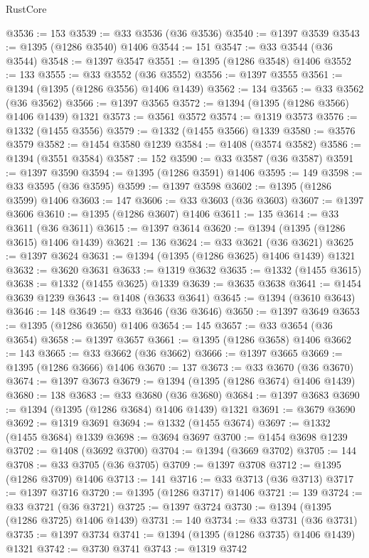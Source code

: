 \begin{lexlean}{RustCore}
\begin{coremodule}
@3536 := 153
@3539 := @33 @3536 (@36 @3536)
@3540 := @1397 @3539
@3543 := @1395 (@1286 @3540) @1406
@3544 := 151
@3547 := @33 @3544 (@36 @3544)
@3548 := @1397 @3547
@3551 := @1395 (@1286 @3548) @1406
@3552 := 133
@3555 := @33 @3552 (@36 @3552)
@3556 := @1397 @3555
@3561 := @1394 (@1395 (@1286 @3556) @1406 @1439)
@3562 := 134
@3565 := @33 @3562 (@36 @3562)
@3566 := @1397 @3565
@3572 := @1394 (@1395 (@1286 @3566) @1406 @1439) @1321
@3573 := @3561 @3572
@3574 := @1319 @3573
@3576 := @1332 (@1455 @3556)
@3579 := @1332 (@1455 @3566) @1339
@3580 := @3576 @3579
@3582 := @1454 @3580 @1239
@3584 := @1408 (@3574 @3582)
@3586 := @1394 (@3551 @3584)
@3587 := 152
@3590 := @33 @3587 (@36 @3587)
@3591 := @1397 @3590
@3594 := @1395 (@1286 @3591) @1406
@3595 := 149
@3598 := @33 @3595 (@36 @3595)
@3599 := @1397 @3598
@3602 := @1395 (@1286 @3599) @1406
@3603 := 147
@3606 := @33 @3603 (@36 @3603)
@3607 := @1397 @3606
@3610 := @1395 (@1286 @3607) @1406
@3611 := 135
@3614 := @33 @3611 (@36 @3611)
@3615 := @1397 @3614
@3620 := @1394 (@1395 (@1286 @3615) @1406 @1439)
@3621 := 136
@3624 := @33 @3621 (@36 @3621)
@3625 := @1397 @3624
@3631 := @1394 (@1395 (@1286 @3625) @1406 @1439) @1321
@3632 := @3620 @3631
@3633 := @1319 @3632
@3635 := @1332 (@1455 @3615)
@3638 := @1332 (@1455 @3625) @1339
@3639 := @3635 @3638
@3641 := @1454 @3639 @1239
@3643 := @1408 (@3633 @3641)
@3645 := @1394 (@3610 @3643)
@3646 := 148
@3649 := @33 @3646 (@36 @3646)
@3650 := @1397 @3649
@3653 := @1395 (@1286 @3650) @1406
@3654 := 145
@3657 := @33 @3654 (@36 @3654)
@3658 := @1397 @3657
@3661 := @1395 (@1286 @3658) @1406
@3662 := 143
@3665 := @33 @3662 (@36 @3662)
@3666 := @1397 @3665
@3669 := @1395 (@1286 @3666) @1406
@3670 := 137
@3673 := @33 @3670 (@36 @3670)
@3674 := @1397 @3673
@3679 := @1394 (@1395 (@1286 @3674) @1406 @1439)
@3680 := 138
@3683 := @33 @3680 (@36 @3680)
@3684 := @1397 @3683
@3690 := @1394 (@1395 (@1286 @3684) @1406 @1439) @1321
@3691 := @3679 @3690
@3692 := @1319 @3691
@3694 := @1332 (@1455 @3674)
@3697 := @1332 (@1455 @3684) @1339
@3698 := @3694 @3697
@3700 := @1454 @3698 @1239
@3702 := @1408 (@3692 @3700)
@3704 := @1394 (@3669 @3702)
@3705 := 144
@3708 := @33 @3705 (@36 @3705)
@3709 := @1397 @3708
@3712 := @1395 (@1286 @3709) @1406
@3713 := 141
@3716 := @33 @3713 (@36 @3713)
@3717 := @1397 @3716
@3720 := @1395 (@1286 @3717) @1406
@3721 := 139
@3724 := @33 @3721 (@36 @3721)
@3725 := @1397 @3724
@3730 := @1394 (@1395 (@1286 @3725) @1406 @1439)
@3731 := 140
@3734 := @33 @3731 (@36 @3731)
@3735 := @1397 @3734
@3741 := @1394 (@1395 (@1286 @3735) @1406 @1439) @1321
@3742 := @3730 @3741
@3743 := @1319 @3742

\end{coremodule}
\end{lexlean}
